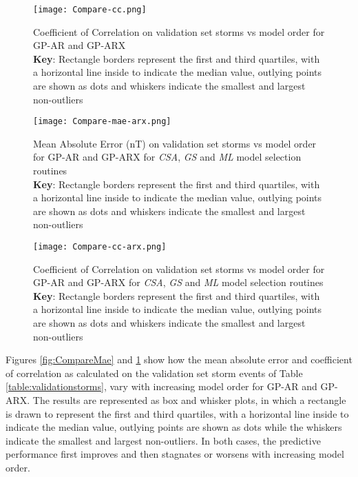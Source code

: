 \begin{figure}
    \noindent\texttt{[image: Compare-cc.png]}
    \caption{Coefficient of Correlation on validation set storms vs model order for GP-AR and GP-ARX \\ \textbf{Key}: Rectangle borders represent the first and third quartiles, with a horizontal line inside to indicate the median value, outlying points are shown as dots and whiskers indicate the smallest and largest non-outliers}
    \label{fig:CompareCC}
\end{figure}
    
    
\begin{figure}
    \noindent\texttt{[image: Compare-mae-arx.png]}
    \caption{Mean Absolute Error (\si{\nano\tesla}) on validation set storms vs model order for GP-AR and GP-ARX for \emph{CSA}, \emph{GS} and \emph{ML} model selection routines \\ \textbf{Key}: Rectangle borders represent the first and third quartiles, with a horizontal line inside to indicate the median value, outlying points are shown as dots and whiskers indicate the smallest and largest non-outliers}
    \label{fig:CompareMaeARX}
\end{figure}
    
\begin{figure}
    \noindent\texttt{[image: Compare-cc-arx.png]}
    \caption{Coefficient of Correlation on validation set storms vs model order for GP-AR and GP-ARX for \emph{CSA}, \emph{GS} and \emph{ML} model selection routines \\ \textbf{Key}: Rectangle borders represent the first and third quartiles, with a horizontal line inside to indicate the median value, outlying points are shown as dots and whiskers indicate the smallest and largest non-outliers}
    \label{fig:CompareCCARX}
\end{figure}
    

Figures \ref{fig:CompareMae} and \ref{fig:CompareCC} show how the mean absolute error and coefficient of correlation as calculated on the validation set storm events of Table \ref{table:validationstorms}, vary with increasing model order for GP-AR and GP-ARX. The results are represented as box and whisker plots, in which a rectangle is drawn to represent the first and third quartiles, with a horizontal line inside to indicate the median value, outlying points are shown as dots while the whiskers indicate the smallest and largest non-outliers. In both cases, the predictive performance first improves and then stagnates or worsens with increasing model order. 

